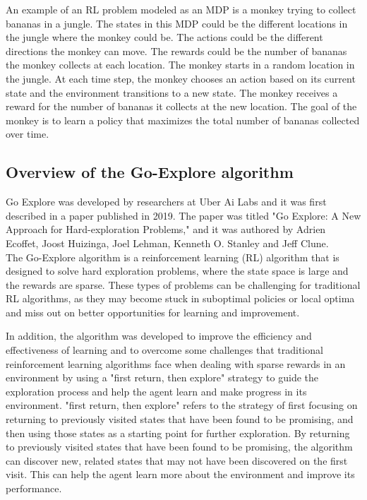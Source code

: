 \documentclass[runningheads]{llncs}%
\begin{document}
An example of an RL problem modeled as an MDP is a monkey trying to collect bananas in a jungle. The states in this MDP could be the different locations in the jungle where the monkey could be. The actions could be the different directions the monkey can move. The rewards could be the number of bananas the monkey collects at each location. The monkey starts in a random location in the jungle. At each time step, the monkey chooses an action based on its current state and the environment transitions to a new state. The monkey receives a reward for the number of bananas it collects at the new location. The goal of the monkey is to learn a policy that maximizes the total number of bananas collected over time.

\subsection{Overview of the Go-Explore algorithm}

Go Explore was developed by researchers at Uber Ai Labs and it was first described in a paper published in 2019. The paper was titled "Go Explore: A New Approach for Hard-exploration Problems," and it was authored by Adrien Ecoffet, Joost Huizinga, Joel Lehman, Kenneth O. Stanley and Jeff Clune.\\

The Go-Explore algorithm is a reinforcement learning (RL) algorithm that is designed to solve hard exploration problems, where the state space is large and the rewards are sparse. These types of problems can be challenging for traditional RL algorithms, as they may become stuck in suboptimal policies or local optima and miss out on better opportunities for learning and improvement.

In addition, the algorithm was developed to improve the efficiency and effectiveness of learning and to overcome some challenges that traditional reinforcement learning algorithms face when dealing with sparse rewards in an environment by using a "first return, then explore" strategy to guide the exploration process and help the agent learn and make progress in its environment. "first return, then explore" refers to the strategy of first focusing on returning to previously visited states that have been found to be promising, and then using those states as a starting point for further exploration. By returning to previously visited states that have been found to be promising, the algorithm can discover new, related states that may not have been discovered on the first visit. This can help the agent learn more about the environment and improve its performance.\\
 
\end{document}
